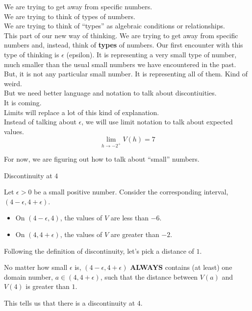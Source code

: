 \documentclass{ximera}
\begin{document}
\begin{idea}


We are trying to get away from specific numbers. \\

We are trying to think of types of numbers. \\

We are trying to think of ``types'' as algebraic conditions or relationships. \\


This part of our new way of thinking.  We are trying to get away from specific numbers and, instead, think of \textbf{types} of numbers.  Our first encounter with this type of thinking is $\epsilon$ (epsilon).  It is representing a very small type of number, much smaller than the usual small numbers we have encountered in the past.  But, it is not any particular small number.  It is representing all of them. Kind of weird. \\


But we need better language and notation to talk about discontiuities. \\

It is coming. \\

Limits will replace a lot of this kind of explanation. \\

Instead of talking about $\epsilon$, we will use limit notation to talk about expected values. \\

\[
\lim\limits_{h \to -2^+} V(h) = 7
\]

For now, we are figuring out how to talk about ``small'' numbers. \\

\end{idea}









\begin{explanation} Discontinuity at $4$


Let $\epsilon > 0$ be a small positive number.  Consider the corresponding interval, $(4 - \epsilon, 4 + \epsilon)$.

\begin{itemize}
\item On $(4 - \epsilon, 4)$, the values of $V$ are less than $-6$.
\item On $(4, 4 + \epsilon)$, the values of $V$ are greater than $-2$.
\end{itemize}


Following the definition of discontinuity, let's pick a distance of $1$.


No matter how small $\epsilon$ is, $(4 - \epsilon, 4 + \epsilon)$ \textbf{\textcolor{red!90!darkgray}{ALWAYS}} contains (at least) one domain number, $a \in (4, 4 + \epsilon)$, such that the distance between $V(a)$ and $V(4)$ is greater than $1$.

This tells us that there is a discontinuity at $4$.

\end{explanation}
\end{document}
